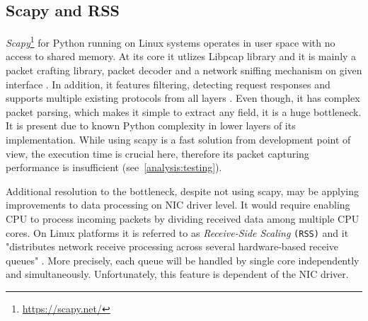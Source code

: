 \documentclass[12pt,a4paper,twoside]{report}
\begin{document}
		\subsection{Scapy and RSS} \label{analysis:mechs:scapy_rss}
			\emph{Scapy}\footnote{\url{https://scapy.net/}} for Python running on Linux systems operates in user space with no access to shared memory. At its core it utlizes Libpcap library and it is mainly a packet crafting library, packet decoder and a network sniffing mechanism on given interface \cite{web:scapy}. In addition, it features filtering, detecting request responses and supports multiple existing protocols from all layers \cite{docs:scapy}. Even though, it has complex packet parsing, which makes it simple to extract any field, it is a huge bottleneck. It is present due to known Python complexity in lower layers of its implementation. While using scapy is a fast solution from development point of view, the execution time is crucial here, therefore its packet capturing performance is insufficient (see~\autoref{analysis:testing}).\par
			Additional resolution to the bottleneck, despite not using scapy, may be applying improvements to data processing on NIC driver level. It would require enabling CPU to process incoming packets by dividing received data among multiple CPU cores. On Linux platforms it is referred to as \emph{Receive-Side Scaling} \texttt{(RSS)} and it "distributes network receive processing across several hardware-based receive queues" \cite{web:redhat:rss}. More precisely, each queue will be handled by single core independently and simultaneously. Unfortunately, this feature is dependent of the NIC driver.
\end{document}
